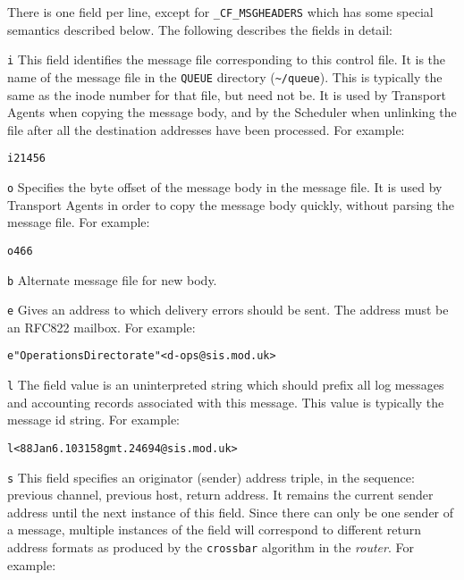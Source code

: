 There is one field per line, except for {\tt \_CF\_MSGHEADERS} which  has
some special semantics described below.  The following describes the fields
in detail:

{\tt i}     
This field identifies the message file corresponding to this control
file.  It is the name of the message file in the {\tt QUEUE}
directory ({\tt \~{}/queue}).  This is typically the same as the
inode number for that file, but need not be.  It is used by Transport
Agents when copying the message body, and by the Scheduler when
unlinking the file after all the destination addresses have been
processed.  For example:

\begin{alltt}
          i 21456
\end{alltt}


{\tt o}     
Specifies the byte offset of the message body in the message file.  It
is used by Transport Agents in order to copy the message body quickly,
without parsing the message file.  For example:

\begin{alltt}
          o 466
\end{alltt}


{\tt b}     
Alternate message file for new body.

{\tt e}     
Gives an address to which delivery errors should be sent.  The address
must be an RFC822 mailbox.  For example:

\begin{alltt}
          e "Operations Directorate" <d-ops@sis.mod.uk>
\end{alltt}


{\tt l}     
The field value is an uninterpreted string which should prefix all log
messages and accounting records associated with this message.  This
value is typically the message id string.  For example:

\begin{alltt}
          l <88Jan6.103158gmt.24694@sis.mod.uk>
\end{alltt}


{\tt s}     
This field specifies an originator (sender) address triple, in the
sequence: previous channel, previous host, return address.  It remains
the current sender address until the next instance of this field.
Since there can only be one sender of a message, multiple instances of
the field will correspond to different return address formats as
produced by the {\tt crossbar} algorithm in the {\em router}.
For example:

